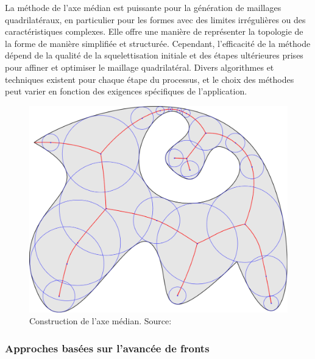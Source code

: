 La méthode de l'axe médian est puissante pour la génération de maillages quadrilatéraux, en particulier pour les formes avec des limites irrégulières ou des caractéristiques complexes. Elle offre une manière de représenter la topologie de la forme de manière simplifiée et structurée. Cependant, l'efficacité de la méthode dépend de la qualité de la squelettisation initiale et des étapes ultérieures prises pour affiner et optimiser le maillage quadrilatéral. Divers algorithmes et techniques existent pour chaque étape du processus, et le choix des méthodes peut varier en fonction des exigences spécifiques de l'application.

\begin{figure}
    \centering
    \includegraphics[scale=0.3]{images/median_axis.pdf}
    \caption{Construction de l'axe médian. Source: \cite{de2009fast}}
    \label{fig:median_axis}
\end{figure}

\subsubsection{Approches basées sur l'avancée de fronts}


